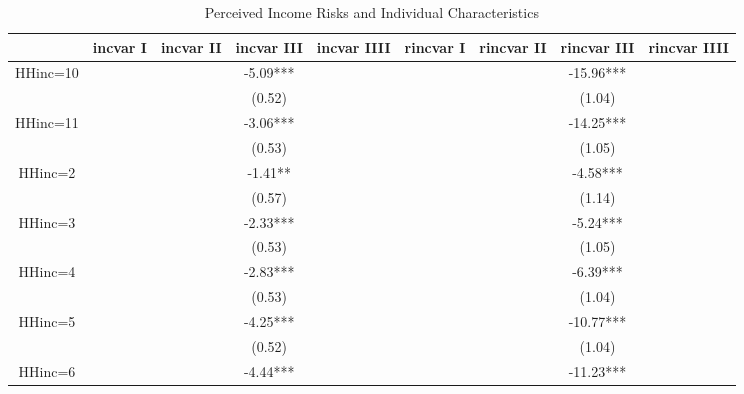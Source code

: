 
\begin{table}[ht]
\centering
\begin{adjustbox}{width={0.9\textwidth},totalheight={\textheight}}
\begin{threeparttable}
\caption{Perceived Income Risks and Individual Characteristics}
\label{micro_reg}\begin{tabular}{ccccccccc}
\toprule
{} & incvar I & incvar II & incvar III & incvar IIII & rincvar I & rincvar II & rincvar III & rincvar IIII \\
\midrule
HHinc=10     &          &           &   -5.09*** &             &           &            &   -15.96*** &              \\
             &          &           &     (0.52) &             &           &            &      (1.04) &              \\
HHinc=11     &          &           &   -3.06*** &             &           &            &   -14.25*** &              \\
             &          &           &     (0.53) &             &           &            &      (1.05) &              \\
HHinc=2      &          &           &    -1.41** &             &           &            &    -4.58*** &              \\
             &          &           &     (0.57) &             &           &            &      (1.14) &              \\
HHinc=3      &          &           &   -2.33*** &             &           &            &    -5.24*** &              \\
             &          &           &     (0.53) &             &           &            &      (1.05) &              \\
HHinc=4      &          &           &   -2.83*** &             &           &            &    -6.39*** &              \\
             &          &           &     (0.53) &             &           &            &      (1.04) &              \\
HHinc=5      &          &           &   -4.25*** &             &           &            &   -10.77*** &              \\
             &          &           &     (0.52) &             &           &            &      (1.04) &              \\
HHinc=6      &          &           &   -4.44*** &             &           &            &   -11.23*** &              \\

\end{tabular}
\end{threeparttable}
\end{adjustbox}
\end{table}
